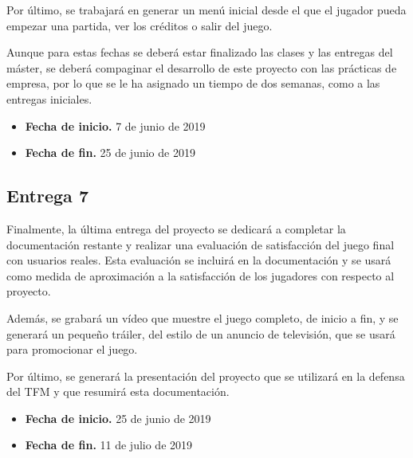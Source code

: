 Por último, se trabajará en generar un menú inicial desde el que el jugador pueda empezar una partida, ver los créditos o salir del juego.

Aunque para estas fechas se deberá estar finalizado las clases y las entregas del máster, se deberá compaginar el desarrollo de este proyecto con las prácticas de empresa, por lo que se le ha asignado un tiempo de dos semanas, como a las entregas iniciales.

\begin{itemize}
    \item \textbf{Fecha de inicio.} 7 de junio de 2019
    \item \textbf{Fecha de fin.} 25 de junio de 2019
\end{itemize}


\subsection{Entrega 7}

Finalmente, la última entrega del proyecto se dedicará a completar la documentación restante y realizar una evaluación de satisfacción del juego final con usuarios reales. Esta evaluación se incluirá en la documentación y se usará como medida de aproximación a la satisfacción de los jugadores con respecto al proyecto. 

Además, se grabará un vídeo que muestre el juego completo, de inicio a fin, y se generará un pequeño tráiler, del estilo de un anuncio de televisión, que se usará para promocionar el juego.

Por último, se generará la presentación del proyecto que se utilizará en la defensa del \acs{TFM} y que resumirá esta documentación.

\begin{itemize}
    \item \textbf{Fecha de inicio.} 25 de junio de 2019
    \item \textbf{Fecha de fin.} 11 de julio de 2019
\end{itemize}